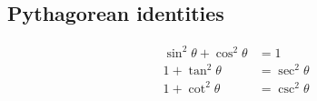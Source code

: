\subsection*{Pythagorean identities}

\begin{align*}
  \sin^2 \theta + \cos^2 \theta &= 1\\
  1 + \tan^2 \theta &= \sec^2 \theta\\
  1 + \cot^2 \theta &= \csc^2 \theta
\end{align*}